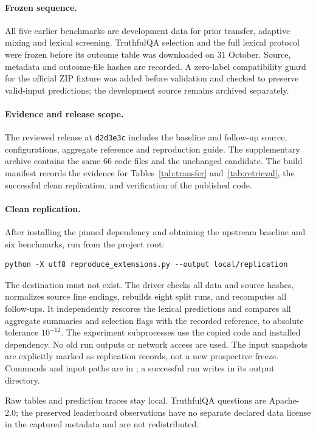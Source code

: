\documentclass{article}
\begin{document}
\paragraph{Frozen sequence.}
All five earlier benchmarks are development data for prior transfer, adaptive
mixing and lexical screening. TruthfulQA selection and the full lexical protocol
were frozen before its outcome table was downloaded on 31 October. Source,
metadata and outcome-file hashes are recorded. A zero-label compatibility guard
for the official ZIP fixture was added before validation and checked to preserve
valid-input predictions; the development source remains archived separately.

\paragraph{Evidence and release scope.}
The reviewed release at \texttt{d2d3e3c} includes the baseline and follow-up
source, configurations, aggregate reference and reproduction guide. The
supplementary archive contains the same 66 code files and the unchanged
candidate. The build manifest records the evidence for Tables~\ref{tab:transfer}
and~\ref{tab:retrieval}, the successful clean replication, and verification
of the published code.

\paragraph{Clean replication.}
After installing the pinned dependency and obtaining the upstream baseline and
six benchmarks, run from the project root:
\begin{verbatim}
python -X utf8 reproduce_extensions.py --output local/replication
\end{verbatim}
The destination must not exist. The driver checks all data and source hashes,
normalizes source line endings, rebuilds eight split runs, and recomputes all
follow-ups. It independently rescores the lexical predictions and compares all
aggregate summaries and selection flags with the recorded reference, to absolute
tolerance $10^{-12}$. The experiment subprocesses use the copied code and installed
dependency. No old run outputs or network access are used. The input snapshots are explicitly
marked as replication records, not a new prospective freeze. Commands and input
paths are in ; a successful run writes
 in its output directory.

Raw tables and prediction traces stay local. TruthfulQA questions are Apache-2.0;
the preserved leaderboard observations have no separate declared data license
in the captured metadata and are not redistributed.
\end{document}
